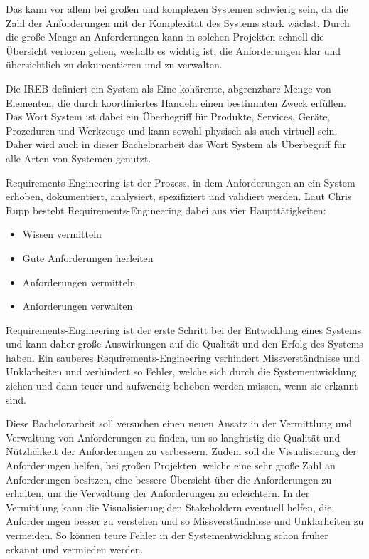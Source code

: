     Das kann vor allem bei großen und komplexen Systemen schwierig sein, da die Zahl der Anforderungen mit der Komplexität des Systems stark wächst.
    Durch die große Menge an Anforderungen kann in solchen Projekten schnell die Übersicht verloren gehen, weshalb es wichtig ist, die Anforderungen klar und übersichtlich zu dokumentieren und zu verwalten.


    Die IREB definiert ein System als \glqq{}Eine kohärente, abgrenzbare Menge von Elementen, die durch koordiniertes Handeln einen bestimmten Zweck erfüllen.\grqq{} \autocite[][]{ireb_cpre_glossary}
    Das Wort System ist dabei ein Überbegriff für Produkte, Services, Geräte, Prozeduren und Werkzeuge und kann sowohl physisch als auch virtuell sein.
    Daher wird auch in dieser Bachelorarbeit das Wort System als Überbegriff für alle Arten von Systemen genutzt.


    Requirements-Engineering ist der Prozess, in dem Anforderungen an ein System erhoben, dokumentiert, analysiert, spezifiziert und validiert werden.
    Laut Chris Rupp besteht Requirements-Engineering dabei aus vier Haupttätigkeiten:
    \begin{itemize}
        \item Wissen vermitteln
        \item Gute Anforderungen herleiten
        \item Anforderungen vermitteln
        \item Anforderungen verwalten
    \end{itemize}
    Requirements-Engineering ist der erste Schritt bei der Entwicklung eines Systems und kann daher große Auswirkungen auf die Qualität und den Erfolg des Systems haben.
    Ein sauberes Requirements-Engineering verhindert Missverständnisse und Unklarheiten und verhindert so Fehler, welche sich durch die Systementwicklung ziehen und dann teuer und aufwendig behoben werden müssen, wenn sie erkannt sind.
    \autocite[][S.20]{Rupp2014}

    Diese Bachelorarbeit soll versuchen einen neuen Ansatz in der Vermittlung und Verwaltung von Anforderungen zu finden, um so langfristig die Qualität und Nützlichkeit der Anforderungen zu verbessern.
    Zudem soll die Visualisierung der Anforderungen helfen, bei großen Projekten, welche eine sehr große Zahl an Anforderungen besitzen, eine bessere Übersicht über die Anforderungen zu erhalten, um die Verwaltung der Anforderungen zu erleichtern.
    In der Vermittlung kann die Visualisierung den Stakeholdern eventuell helfen, die Anforderungen besser zu verstehen und so Missverständnisse und Unklarheiten zu vermeiden.
    So können teure Fehler in der Systementwicklung schon früher erkannt und vermieden werden.
    

